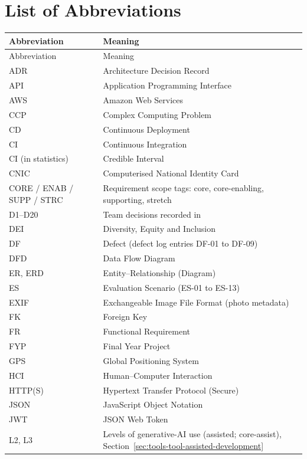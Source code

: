\chapter*{List of Abbreviations}
\begin{longtable}{@{}L{64pt}L{315pt}@{}}
\toprule
Abbreviation & Meaning \\
\midrule
\endfirsthead
\toprule
Abbreviation & Meaning \\
\midrule
\endhead
\bottomrule
\endlastfoot
ADR & Architecture Decision Record \\
API & Application Programming Interface \\
AWS & Amazon Web Services \\
CCP & Complex Computing Problem \\
CD & Continuous Deployment \\
CI & Continuous Integration \\
CI (in statistics) & Credible Interval \\
CNIC & Computerised National Identity Card \\
CORE / ENAB / SUPP / STRC & Requirement scope tags: core, core-enabling, supporting, stretch \\
D1--D20 & Team decisions recorded in  \\
DEI & Diversity, Equity and Inclusion \\
DF & Defect (defect log entries DF-01 to DF-09) \\
DFD & Data Flow Diagram \\
ER, ERD & Entity--Relationship (Diagram) \\
ES & Evaluation Scenario (ES-01 to ES-13) \\
EXIF & Exchangeable Image File Format (photo metadata) \\
FK & Foreign Key \\
FR & Functional Requirement \\
FYP & Final Year Project \\
GPS & Global Positioning System \\
HCI & Human--Computer Interaction \\
HTTP(S) & Hypertext Transfer Protocol (Secure) \\
JSON & JavaScript Object Notation \\
JWT & JSON Web Token \\
L2, L3 & Levels of generative-AI use (assisted; core-assist), Section~\ref{sec:tools-tool-assisted-development} \\

\end{longtable}
